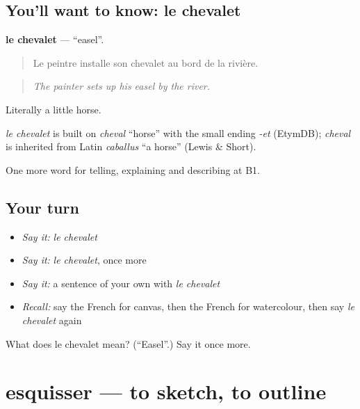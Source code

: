 \subsection*{You'll want to know: le chevalet}
\textbf{le chevalet} — \textquotedblleft{}easel\textquotedblright{}.

\begin{quote}
Le peintre installe son chevalet au bord de la rivière.
\end{quote}

\begin{quote}
\emph{The painter sets up his easel by the river.}
\end{quote}

Literally a little horse.

\begin{cousinweb}
\emph{le chevalet} is built on \emph{cheval} \textquotedblleft{}horse\textquotedblright{} with the small ending \emph{-et} (EtymDB); \emph{cheval} is inherited from Latin \emph{caballus} \textquotedblleft{}a horse\textquotedblright{} (Lewis \& Short).
\end{cousinweb}

\begin{grammarlens}[title={What you've built}]
One more word for telling, explaining and describing at B1.
\end{grammarlens}

\subsection*{Your turn}
\begin{itemize}
\raggedright
  \item \emph{Say it:} \emph{le chevalet}
  \item \emph{Say it:} \emph{le chevalet}, once more
  \item \emph{Say it:} a sentence of your own with \emph{le chevalet}
  \item \emph{Recall:} say the French for canvas, then the French for watercolour, then say \emph{le chevalet} again
\end{itemize}

\begin{tcolorbox}[breakable,colback=teal!4,colframe=teal!35!black,title={Before you move on}]
What does le chevalet mean? (\textquotedblleft{}Easel\textquotedblright{}.) Say it once more.
\end{tcolorbox}
\section[esquisser]{esquisser — to sketch, to outline}

